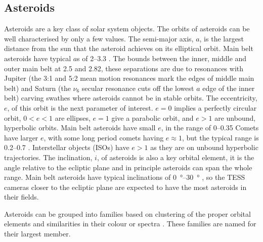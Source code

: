 \documentclass[12pt]{article}
\begin{document}
\subsection{Asteroids}\label{SubSec:Asteroid}

Asteroids are a key class of solar system objects.
The orbits of asteroids can be well characterised by only a few values. The semi-major axis, $a$, is the largest distance from the sun that the asteroid achieves on its elliptical orbit.
Main belt asteroids have typical $a$s of \qtyrange{2}{3.3}{\au} \citet{DeMeo2015}.
The bounds between the inner, middle and outer main belt at \qty{2.5}{\au} and \qty{2.82}{\au}, these separations are due to resonances with Jupiter (the 3:1 and 5:2 mean motion resonances mark the edges of middle main belt) and Saturn (the $\nu_6$ secular resonance cuts off the lowest $a$ edge of the inner belt) carving swathes where asteroids cannot be in stable orbits.
The eccentricity, $e$, of this orbit is the next parameter of interest. $e=0$ implies a perfectly circular orbit, $0<e<1$ are ellipses, $e=1$ give a parabolic orbit, and $e>1$ are unbound, hyperbolic orbits.
Main belt asteroids have small $e$, in the range of \qtyrange{0}{0.35}{} \citep{DeMeo2015}
Comets have larger $e$, with some long period comets having $e\approx 1$, but the typical range is \qtyrange{0.2}{0.7}{} \citep{Lewis2012}.
Interstellar objects (ISOs) have $e>1$ as they are on unbound hyperbolic trajectories.
The inclination, $i$, of asteroids is also a key orbital element, it is the angle relative to the ecliptic plane and in principle asteroids can span the whole range.
Main belt asteroids have typical inclinations of \qtyrange{0}{30}{\degree} \citep{DeMeo2015}, so the TESS cameras closer to the ecliptic plane are expected to have the most asteroids in their fields.


Asteroids can be grouped into families based on clustering of the proper orbital elements and similarities in their colour or spectra \citep{Nesvorny2015}.
These families are named for their largest member.

\end{document}
